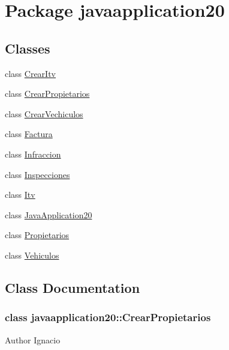 \hypertarget{namespacejavaapplication20}{}\section{Package javaapplication20}
\label{namespacejavaapplication20}
\subsection*{Classes}
\begin{DoxyCompactItemize}
\item 
class \mbox{\hyperlink{classjavaapplication20_1_1_crear_itv}{Crear\+Itv}}
\item 
class \mbox{\hyperlink{namespacejavaapplication20_classjavaapplication20_1_1_crear_propietarios}{Crear\+Propietarios}}
\item 
class \mbox{\hyperlink{namespacejavaapplication20_classjavaapplication20_1_1_crear_vechiculos}{Crear\+Vechiculos}}
\item 
class \mbox{\hyperlink{namespacejavaapplication20_classjavaapplication20_1_1_factura}{Factura}}
\item 
class \mbox{\hyperlink{namespacejavaapplication20_classjavaapplication20_1_1_infraccion}{Infraccion}}
\item 
class \mbox{\hyperlink{namespacejavaapplication20_classjavaapplication20_1_1_inspecciones}{Inspecciones}}
\item 
class \mbox{\hyperlink{classjavaapplication20_1_1_itv}{Itv}}
\item 
class \mbox{\hyperlink{classjavaapplication20_1_1_java_application20}{Java\+Application20}}
\item 
class \mbox{\hyperlink{classjavaapplication20_1_1_propietarios}{Propietarios}}
\item 
class \mbox{\hyperlink{classjavaapplication20_1_1_vehiculos}{Vehiculos}}
\end{DoxyCompactItemize}


\subsection{Class Documentation}
\label{classjavaapplication20_1_1_crear_propietarios}
\subsubsection{class javaapplication20\+:\+:Crear\+Propietarios}
\begin{DoxyAuthor}{Author}
Ignacio 
\end{DoxyAuthor}
\label{classjavaapplication20_1_1_crear_vechiculos}
